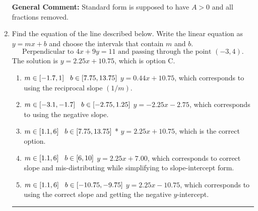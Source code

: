 \documentclass{extbook}[14pt]
\newcommand{\litem}[1]{\item #1

\rule{\textwidth}{0.4pt}}
\begin{document}
\begin{enumerate}
{\textbf{General Comment:} Standard form is supposed to have $A > 0$ and all fractions removed.
}
\litem{
Find the equation of the line described below. Write the linear equation as $ y=mx+b $ and choose the intervals that contain $m$ and $b$.
\[ \text{Perpendicular to } 4 x + 9 y = 11 \text{ and passing through the point } (-3, 4). \]
The solution is \( y = 2.25x + 10.75 \), which is option C.\begin{enumerate}[label=\Alph*.]
\item \( m \in [-1.7, 1] \hspace*{3mm} b \in [7.75, 13.75] \)
 $y = 0.44x + 10.75$, which corresponds to using the reciprocal slope $(1/m)$.
\item \( m \in [-3.1, -1.7] \hspace*{3mm} b \in [-2.75, 1.25] \)
 $y = -2.25x - 2.75$, which corresponds to using the negative slope.
\item \( m \in [1.1, 6] \hspace*{3mm} b \in [7.75, 13.75] \)
* $y = 2.25x + 10.75$, which is the correct option.
\item \( m \in [1.1, 6] \hspace*{3mm} b \in [6, 10] \)
 $y = 2.25x + 7.00$, which corresponds to correct slope and mis-distributing while simplifying to slope-intercept form.
\item \( m \in [1.1, 6] \hspace*{3mm} b \in [-10.75, -9.75] \)
 $y = 2.25x - 10.75$, which corresponds to using the correct slope and getting the negative $y$-intercept.
\end{enumerate}

}
\end{enumerate}
\end{document}
